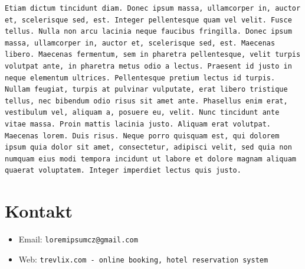 \documentclass[a4paper, 12pt]{article}
\begin{document}
\begin{verbatim}
Etiam dictum tincidunt diam. Donec ipsum massa, ullamcorper in, auctor et, scelerisque sed, est. Integer pellentesque quam vel velit. Fusce tellus. Nulla non arcu lacinia neque faucibus fringilla. Donec ipsum massa, ullamcorper in, auctor et, scelerisque sed, est. Maecenas libero. Maecenas fermentum, sem in pharetra pellentesque, velit turpis volutpat ante, in pharetra metus odio a lectus. Praesent id justo in neque elementum ultrices. Pellentesque pretium lectus id turpis. Nullam feugiat, turpis at pulvinar vulputate, erat libero tristique tellus, nec bibendum odio risus sit amet ante. Phasellus enim erat, vestibulum vel, aliquam a, posuere eu, velit. Nunc tincidunt ante vitae massa. Proin mattis lacinia justo. Aliquam erat volutpat. Maecenas lorem. Duis risus. Neque porro quisquam est, qui dolorem ipsum quia dolor sit amet, consectetur, adipisci velit, sed quia non numquam eius modi tempora incidunt ut labore et dolore magnam aliquam quaerat voluptatem. Integer imperdiet lectus quis justo.

\end{verbatim}

\section*{Kontakt}
\begin{itemize}
    \item Email: \texttt{loremipsumcz@gmail.com}
    \item Web: \texttt{trevlix.com - online booking, hotel reservation system}
\end{itemize}
\end{document}
